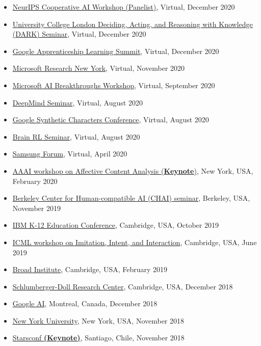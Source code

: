 \documentclass[paper=letter,fontsize=11pt]{scrartcl} %
\newcommand{\TalkEntry}[4]{
        \noindent \href{#4}{#1}, #2, #3 }
\begin{document}
\begin{itemize}
\item\TalkEntry{NeurIPS Cooperative AI Workshop (Panelist)}{Virtual}{December 2020}{https://www.cooperativeai.com/neurips-2020/speakers}
\item\TalkEntry{University College London Deciding, Acting, and Reasoning with Knowledge (DARK) Seminar}{Virtual}{December 2020}{https://www.youtube.com/watch?v=traKBhJm4lQ&feature=youtu.be}
\item\TalkEntry{Google Apprenticeship Learning Summit}{Virtual}{December 2020}{https://sites.google.com/corp/google.com/alsummit2020}
\item\TalkEntry{Microsoft Research New York}{Virtual}{November 2020}{}
\item\TalkEntry{Microsoft AI Breakthroughs Workshop}{Virtual}{September 2020}{https://www.microsoft.com/en-us/research/event/ai-breakthroughs-2020/#!agenda}
\item\TalkEntry{DeepMind Seminar}{Virtual}{August 2020}{}
\item\TalkEntry{Google Synthetic Characters Conference}{Virtual}{August 2020}{https://sites.google.com/corp/google.com/sc2020/schedule-agenda?authuser=0} 
\item\TalkEntry{Brain RL Seminar}{Virtual}{August 2020}{} 
\item\TalkEntry{Samsung Forum}{Virtual}{April 2020}{https://www.samsung.com/us/ssic/session/towards-social-and-affective-machine-learning/} 
\item\TalkEntry{AAAI workshop on Affective Content Analysis (\textbf{Keynote})}{New York, USA}{February 2020}{https://sites.google.com/corp/view/affcon2020/invited-speakers} 
\item\TalkEntry{Berkeley Center for Human-compatible AI (CHAI) seminar}{Berkeley, USA}{November 2019}{} 
\item\TalkEntry{IBM K-12 Education Conference}{Cambridge, USA}{October 2019}{} 
\item\TalkEntry{ICML workshop on Imitation, Intent, and Interaction}{Cambridge, USA}{June 2019}{https://slideslive.com/38917621/social-learning-from-agents-and-humans} 
\item\TalkEntry{Broad Institute}{Cambridge, USA}{February 2019}{https://www.youtube.com/watch?v=Vx5Daxa0Yts} 
\item\TalkEntry{Schlumberger-Doll Research Center}{Cambridge, USA}{December 2018}{} 
\item\TalkEntry{Google AI}{Montreal, Canada}{December 2018}{} 
\item\TalkEntry{New York University}{New York, USA}{November 2018}{} 
\item\TalkEntry{Starsconf \textbf{(Keynote)}}{Santiago, Chile}{November 2018}{https://www.youtube.com/watch?v=QI5Gvn8FDG0} 


\end{itemize}
\end{document}
